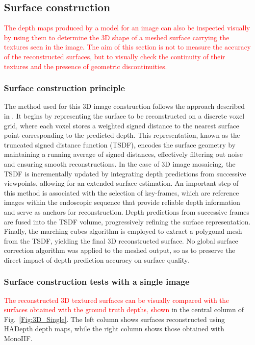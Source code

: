 \documentclass[a4paper,fleqn]{cas-dc}
\begin{document}
\subsection{Surface construction}
\label{sec:surface}


\textcolor{red}{The depth maps produced by a model for an image can also be inspected visually by using them to determine the 3D shape of a meshed surface carrying the textures seen in the image. The aim of this section is not to measure the accuracy of the reconstructed surfaces, but to visually check the continuity of their textures and the presence of geometric discontinuities.}

\subsubsection*{Surface construction principle}

The method used for this 3D image construction follows the approach described in \citep{Recasens_IEEERAL_2021}. It begins by representing the surface to be reconstructed on a discrete voxel grid, where each voxel stores a weighted signed distance to the nearest surface point corresponding to the predicted depth. This representation, known as the truncated signed distance function (TSDF), encodes the surface geometry by maintaining a running average of signed distances, effectively filtering out noise and ensuring smooth reconstructions. In the case of 3D image mosaicing, the TSDF is incrementally updated by integrating depth predictions from successive viewpoints, allowing for an extended surface estimation. An important step of this 
method is associated with the selection of key-frames, which are reference images within the endoscopic sequence that provide reliable depth information and serve as anchors for reconstruction. Depth predictions from successive frames are fused into the TSDF volume, progressively refining the surface representation. 
Finally, the marching cubes algorithm \citep{Lorensen_SIGGRAPH_1987} is employed to extract a polygonal mesh from the TSDF, yielding the final 3D reconstructed surface. No global surface correction algorithm was applied to the meshed output, so as to preserve the direct impact of depth prediction accuracy on surface quality.

\subsubsection*{Surface construction tests with a single image}
\textcolor{red}{The reconstructed 3D textured surfaces can be visually compared with the surfaces obtained with the ground truth depths, shown} in the central column of 
Fig.~\ref{Fig:3D_Single}. The left column shows surfaces reconstructed using HADepth depth maps, while the right column shows those obtained with MonoIIF.
\end{document}
